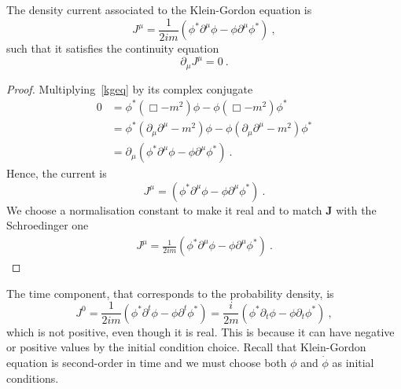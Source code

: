     The density current associated to the Klein-Gordon equation is 
    \begin{equation}\label{cons}
        J^\mu = \frac{1}{2im} (\phi^* \partial^\mu \phi - \phi \partial^\mu \phi^*) ~,
    \end{equation}
    such that it satisfies the continuity equation 
    \begin{equation*}
        \partial_\mu J^\mu = 0 ~.
    \end{equation*}
    \begin{proof}
       Multiplying~\eqref{kgeq} by its complex conjugate
        \begin{equation*}
        \begin{aligned}
            0 & = \phi^* (\Box - m^2) \phi - \phi (\Box - m^2) \phi^* \\ & = \phi^* (\partial_\mu \partial^\mu - m^2) \phi - \phi (\partial_\mu \partial^\mu - m^2) \phi^* \\ & = \partial_\mu (\phi^* \partial^\mu \phi - \phi \partial^\mu \phi^*) ~.
        \end{aligned}
        \end{equation*}
        Hence, the current is 
        \begin{equation*}
            J^\mu = (\phi^* \partial^\mu \phi - \phi \partial^\mu \phi^*) ~.
        \end{equation*}
        We choose a normalisation constant to make it real and to match $\mathbf J$ with the Schroedinger one
        \begin{eqnarray}
            J^\mu = \frac{1}{2im} (\phi^* \partial^\mu \phi - \phi \partial^\mu \phi^*) ~.
        \end{eqnarray}
    \end{proof}
    The time component, that corresponds to the probability density, is 
    \begin{equation*}
        J^0 = \frac{1}{2im} (\phi^* \partial^t \phi - \phi \partial^t \phi^*) = \frac{i}{2m} (\phi^* \partial_t \phi - \phi \partial_t \phi^*) ~,
    \end{equation*}
    which is not positive, even though it is real. This is because it can have negative or positive values by the initial condition choice. Recall that Klein-Gordon equation is second-order in time and we must choose both $\phi$ and $\dot \phi$ as initial conditions.
    

